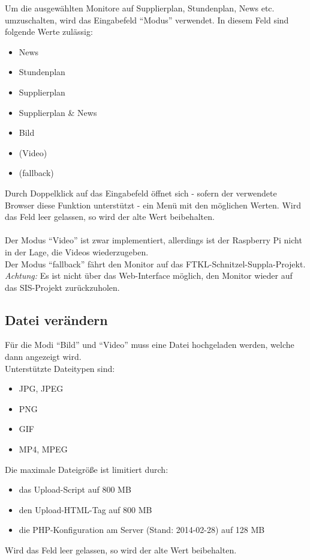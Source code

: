 Um die ausgewählten Monitore auf Supplierplan, Stundenplan, News etc. umzuschalten, wird das Eingabefeld \enquote{Modus} verwendet. In diesem Feld sind folgende Werte zulässig:
\begin{itemize}
	\item News
	\item Stundenplan
	\item Supplierplan
	\item Supplierplan \& News
	\item Bild
	\item (Video)
	\item (fallback)
\end{itemize}
Durch Doppelklick auf das Eingabefeld öffnet sich - sofern der verwendete Browser diese Funktion unterstützt - ein Menü mit den möglichen Werten. Wird das Feld leer gelassen, so wird der alte Wert beibehalten.\\
\\
Der Modus \enquote{Video} ist zwar implementiert, allerdings ist der Raspberry Pi nicht in der Lage, die Videos wiederzugeben.\\
Der Modus \enquote{fallback} fährt den Monitor auf das FTKL-Schnitzel-Suppla-Projekt.\\ 
\textit{Achtung:} Es ist nicht über das Web-Interface möglich, den Monitor wieder auf das SIS-Projekt zurückzuholen.

\subsection{Datei verändern}

Für die Modi \enquote{Bild} und \enquote{Video} muss eine Datei hochgeladen werden, welche dann angezeigt wird.\\ 
Unterstützte Dateitypen sind:
\begin{itemize}
	\item JPG, JPEG
	\item PNG
	\item GIF
	\item MP4, MPEG
\end{itemize}
Die maximale Dateigröße ist limitiert durch:
\begin{itemize}
	\item das Upload-Script auf 800 MB
	\item den Upload-HTML-Tag auf 800 MB
	\item die PHP-Konfiguration am Server (Stand: 2014-02-28) auf 128 MB
\end{itemize}
Wird das Feld leer gelassen, so wird der alte Wert beibehalten.\\

